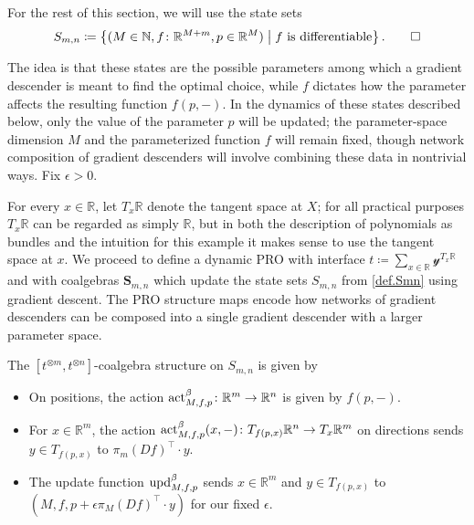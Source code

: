 \documentclass[11pt, one side, article]{memoir}
\theoremstyle{definition}
\theoremstyle{plain}
\newenvironment{definition}
  {\pushQED{\qed}\renewcommand{\qedsymbol}{$\lozenge$}\definitionx}
  {\popQED\enddefinitionx}
\newcommand{\Cat}[1]{\mathbf{#1}}%
\newcommand{\tn}[1]{\textnormal{#1}}
\newcommand{\nn}{\mathbb{N}}
\newcommand{\rr}{\mathbb{R}}
\newcommand{\act}{\tn{act}}
\newcommand{\upd}{\tn{upd}}
\newcommand{\yon}{\mathcal{y}}
\newcommand{\0}{\textsf{0}}
\newcommand{\1}{\tn{\textsf{1}}}
\renewcommand{\S}{{\Cat{S}}}
\begin{document}
\begin{definition}\label{def.Smn}
For the rest of this section, we will use the state sets 
\[
S_{m,n} \coloneqq \left\{(M \in \nn, f\colon \rr^{M+m}, p \in \rr^M) \;\middle|\; f \textrm{ is differentiable}\right\}.
\qedhere
\]
\end{definition}

The idea is that these states are the possible parameters among which a gradient descender is meant to find the optimal choice, while $f$ dictates how the parameter affects the resulting function $f(p,-)$. In the dynamics of these states described below, only the value of the parameter $p$ will be updated; the parameter-space dimension $M$ and the parameterized function $f$ will remain fixed, though network composition of gradient descenders will involve combining these data in nontrivial ways. Fix $\epsilon>0$.%

For every $x\in\rr$, let $T_x\rr$ denote the tangent space at $X$; for all practical purposes $T_x \rr$ can be regarded as simply $\rr$, but in both the description of polynomials as bundles and the intuition for this example it makes sense to use the tangent space at $x$. We proceed to define a dynamic PRO with interface $t \coloneqq \sum_{x \in \rr} \yon^{T_x \rr}$ and with  coalgebras $\S_{m,n}$ which update the state sets $S_{m,n}$ from \cref{def.Smn} using gradient descent. The PRO structure maps encode how networks of gradient descenders can be composed into a single gradient descender with a larger parameter space.

\begin{definition}
The $[t^{\otimes m},t^{\otimes n}]$-coalgebra structure on $S_{m,n}$ is given by 
\begin{itemize}
	\item On positions, the action $\act^\beta_{M,f,p}\colon \rr^m \to \rr^n$ is given by $f(p,-)$.
	\item For $x \in \rr^m$, the action $\act^\beta_{M,f,p}(x,-)\colon T_{f(p,x)} \rr^n \to T_x \rr^m$ on directions sends $y\in T_{f(p,x)}$ to $\pi_m (Df)^\top \cdot y$.
	\item The update function $\upd^\beta_{M,f,p}$ sends $x \in \rr^m$ and $y \in T_{f(p,x)}$ to $(M,f,p+\epsilon \pi_M (Df)^\top \cdot y)$ for our fixed $\epsilon$.
	\qedhere
\end{itemize}
\end{definition}
\end{document}
